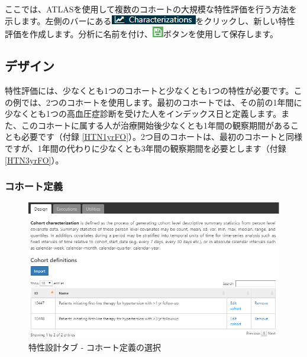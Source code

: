 \documentclass[
  11pt]{book}
\theoremstyle{definition}
\theoremstyle{definition}
\theoremstyle{definition}
\theoremstyle{definition}
\theoremstyle{remark}
\begin{document}
ここでは、ATLASを使用して複数のコホートの大規模な特性評価を行う方法を示します。左側のバーにある\includegraphics{images/Characterization/atlasCharacterizationMenuItem.png}をクリックし、新しい特性評価を作成します。分析に名前を付け、\includegraphics{images/PopulationLevelEstimation/save.png}ボタンを使用して保存します。

\subsection{デザイン}\label{ux30c7ux30b6ux30a4ux30f3}

特性評価には、少なくとも1つのコホートと少なくとも1つの特性が必要です。この例では、2つのコホートを使用します。最初のコホートでは、その前の1年間に少なくとも1つの高血圧症診断を受けた人をインデックス日と定義します。また、このコホートに属する人が治療開始後少なくとも1年間の観察期間があることも必要です（付録 \ref{HTN1yrFO}）。2つ目のコホートは、最初のコホートと同様ですが、1年間の代わりに少なくとも3年間の観察期間を必要とします（付録 \ref{HTN3yrFO}）。

\subsubsection*{コホート定義}\label{ux30b3ux30dbux30fcux30c8ux5b9aux7fa9}

\begin{figure}

{\centering \includegraphics[width=1\linewidth]{images/Characterization/atlasCharacterizationCohortSelection} 

}

\caption{特性設計タブ - コホート定義の選択}\label{fig:atlasCharacterizationCohortSelection}
\end{figure}
\end{document}
